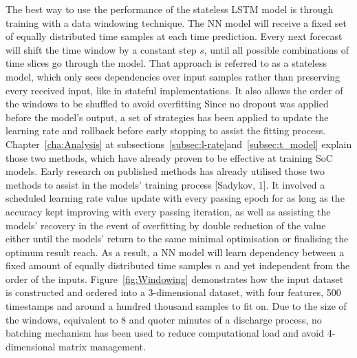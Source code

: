 %
%
The best way to use the performance of the stateless LSTM model is through training with a data windowing technique.
The NN model will receive a fixed set of equally distributed time samples at each time prediction.
Every next forecast will shift the time window by a constant step $s$, until all possible combinations of time slices go through the model.
That approach is referred to as a stateless model, which only sees dependencies over input samples rather than preserving every received input, like in stateful implementations.
It also allows the order of the windows to be shuffled to avoid overfitting
Since no dropout was applied before the model's output, a set of strategies has been applied to update the learning rate and rollback before early stopping to assist the fitting process.
{
    Chapter~\ref{cha:Analysis} at subsections~\ref{subsec:l-rate}and~\ref{subsec:t_model} explain those two methods, which have already proven to be effective at training SoC models.
} 
{
    Early research on published methods has already utilised those two methods to assist in the models' training process [Sadykov, 1].
    It involved a scheduled learning rate value update with every passing epoch for as long as the accuracy kept improving with every passing iteration, as well as assisting the models' recovery in the event of overfitting by double reduction of the value either until the models' return to the same minimal optimisation or finalising the optimum result reach.
}
As a result, a NN model will learn dependency between a fixed amount of equally distributed time samples $n$ and yet independent from the order of the inputs.
\mbox{Figure~\ref{fig:Windowing}} demonstrates how the input dataset is constructed and ordered into a 3-dimensional dataset, with four features, 500 timestamps and around a hundred thousand samples to fit on.
Due to the size of the windows, equivalent to 8 and quoter minutes of a discharge process, no batching mechanism has been used to reduce computational load and avoid 4-dimensional matrix management.


